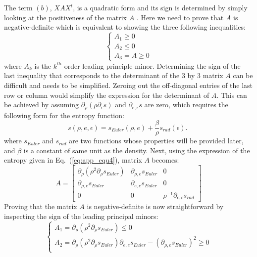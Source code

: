 \documentclass[review]{elsarticle}
\newcommand{\eqt}[1]{Eq.~(\ref{#1})}                     %
\begin{document}
\begin{appendices}
The term $(b)$, $XAX^t$, is a quadratic form and its sign is determined by simply looking at the positiveness of the matrix $A$ \cite{Evans}. Here we need to prove that $A$ is negative-definite which is equivalent to showing the three following inequalities:
\begin{equation}
 \left\{
 \begin{array}{ccc}
 A_1 \geq 0 \\
 A_2 \leq 0 \\
 A_3 = A \geq 0
 \end{array}
 \right.
 \end{equation}
 where $A_k$ is the $k^{th}$ order leading principle minor. Determining the sign of the last inequality that corresponds to the determinant of the $3$ by $3$ matrix $A$ can be difficult and needs to be simplified. Zeroing out the off-diagonal entries of the last row or column would simplify the expression for the determinant of $A$. This can be achieved by assuming $\partial_{\rho}(\rho \partial_{\epsilon} s)$ and $\partial_{e, \epsilon} s$ are zero, which requires the following form for the entropy function:
\begin{equation}
\label{eq:app_equ4}
s(\rho, e, \epsilon) = s_{Euler}(\rho,e) + \frac{\beta}{\rho}s_{rad}(\epsilon) \text{. } 
\end{equation}
where $s_{Euler}$ and $s_{rad}$ are two functions whose properties will be provided later, and $\beta$ is a constant of same unit as the density.
Next, using the expression of the entropy given in \eqt{eq:app_equ4}, matrix $A$ becomes:
 \begin{equation}
 A = 
 \left[
 \begin{array}{ccc}
\partial_{\rho} \left( \rho^2 \partial_{\rho} s_{Euler} \right) & \partial_{\rho,e} s_{Euler} & 0 \\
 \partial_{\rho,e} s_{Euler} & \partial_{e,e} s_{Euler} & 0 \\
 0 & 0 & \rho^{-1} \partial_{\epsilon,\epsilon} s_{rad}
 \end{array}
 \right] \nonumber
 \end{equation}
 Proving that the matrix $A$ is  negative-definite is now straightforward by inspecting the sign of the leading principal minors:
 \begin{equation}
 \label{eq:A_matrix}
 \left\{
 \begin{array}{lll}
 A_1 = \partial_{\rho} \left( \rho^2 \partial_{\rho} s_{Euler} \right) \leq 0 \\
 A_2 = \partial_{\rho} \left( \rho^2 \partial_{\rho} s_{Euler} \right) \partial_{e,e} s_{Euler} - \left( \partial_{\rho,e} s_{Euler} \right)^2 \geq 0\\

\end{array}
\end{equation}
\end{appendices}
\end{document}
